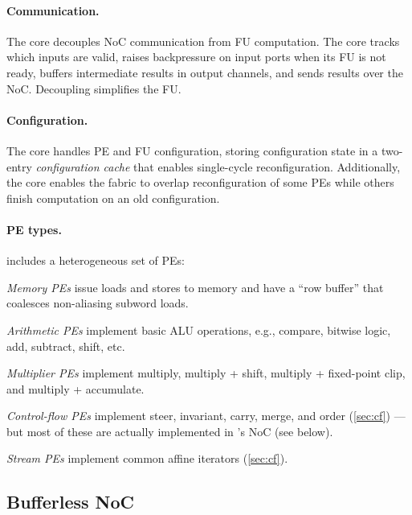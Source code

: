 \paragraph{Communication.}
The \textmu core decouples NoC communication from FU computation.
% 
The \textmu core tracks which inputs are valid, raises backpressure on
input ports when its FU is not ready, buffers intermediate results in
output channels, and sends results over the NoC.
%
Decoupling simplifies the FU.

\paragraph{Configuration.}
The \textmu core handles PE and FU configuration, storing configuration state in a
two-entry {\em configuration cache} that enables single-cycle reconfiguration. 
% 
Additionally, the \textmu core enables the fabric to overlap
reconfiguration of some PEs while others
finish computation on an old configuration.

\paragraph{PE types.}
\riptide includes a heterogeneous set of PEs:
\begin{compactitem}
\item \emph{Memory PEs} issue loads and stores to memory and have a ``row buffer'' that coalesces non-aliasing subword loads.

\item \emph{Arithmetic PEs} implement basic ALU operations, e.g., compare, bitwise logic, add, subtract, shift, etc.

\item \emph{Multiplier PEs} implement multiply, multiply + shift, multiply + fixed-point clip, and multiply + accumulate.

\item \emph{Control-flow PEs} implement steer, invariant, carry, %
  merge, and order (\autoref{sec:cf}) ---
%
but most of these are actually implemented in \riptide's NoC (see below).

\item \emph{Stream PEs} implement common affine iterators (\autoref{sec:cf}).
\end{compactitem}

\subsection{Bufferless NoC}
\label{arch:noc}

